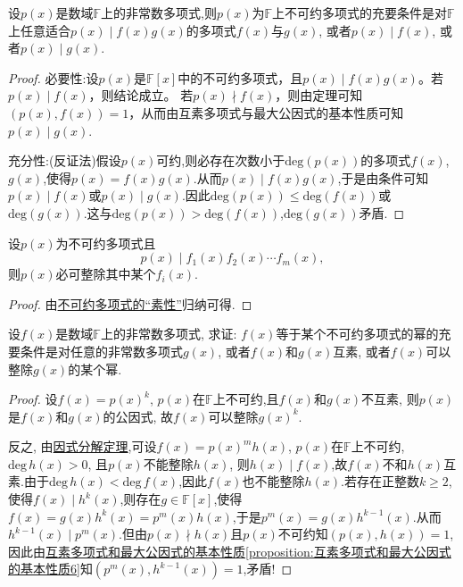 \documentclass[../../main.tex]{subfiles}%
\begin{document}
\begin{theorem}[不可约多项式的“素性”]\label{theorem:不可约多项式的“素性”}
设\(p(x)\)是数域\(\mathbb{F}\)上的非常数多项式,则\(p(x)\)为\(\mathbb{F}\)上不可约多项式的充要条件是对\(\mathbb{F}\)上任意适合\(p(x)\mid f(x)g(x)\)的多项式\(f(x)\)与\(g(x)\), 或者\(p(x)\mid f(x)\), 或者\(p(x)\mid g(x)\).
\end{theorem}
\begin{proof}
必要性:设\(p(x)\)是\(\mathbb{F}[x]\)中的不可约多项式，且\(p(x)\mid f(x)g(x)\)。若\(p(x)\mid f(x)\)，则结论成立。
若\(p(x)\nmid f(x)\)，则由定理可知\((p(x),f(x)) = 1\)，从而由互素多项式与最大公因式的基本性质可知\(p(x)\mid g(x)\).

充分性:(反证法)假设\(p(x)\)可约,则必存在次数小于\(\text{deg}(p(x))\)的多项式\(f(x)\),\(g(x)\),使得\(p(x) = f(x)g(x)\).从而\(p(x) \mid f(x)g(x)\),于是由条件可知\(p(x) \mid f(x)\)或\(p(x) \mid g(x)\).因此\(\text{deg}(p(x)) \leqslant  \text{deg}(f(x))\)或\(\text{deg}(g(x))\).这与\(\text{deg}(p(x)) > \text{deg}(f(x))\),\(\text{deg}(g(x))\)矛盾.
\end{proof}

\begin{corollary}\label{corollary:不可约多项式“素性”的推论}
设\(p(x)\)为不可约多项式且
\[
p(x)\mid f_1(x)f_2(x)\cdots f_m(x),
\]
则\(p(x)\)必可整除其中某个\(f_i(x)\).
\end{corollary}
\begin{proof}
由\hyperref[theorem:不可约多项式的“素性”]{不可约多项式的“素性”}归纳可得.
\end{proof}

\begin{proposition}\label{proposition:多项式可以写成不可约多项式的幂的充要条件}
设\(f(x)\)是数域\(\mathbb{F}\)上的非常数多项式, 求证: \(f(x)\)等于某个不可约多项式的幂的充要条件是对任意的非常数多项式\(g(x)\), 或者\(f(x)\)和\(g(x)\)互素, 或者\(f(x)\)可以整除\(g(x)\)的某个幂.
\end{proposition}
\begin{proof}
设\(f(x)=p(x)^k\), \(p(x)\)在\(\mathbb{F}\)上不可约,且\(f(x)\)和\(g(x)\)不互素, 则\(p(x)\)是\(f(x)\)和\(g(x)\)的公因式, 故\(f(x)\)可以整除\(g(x)^k\).

反之, 由\hyperref[theorem:因式分解定理]{因式分解定理},可设\(f(x)=p(x)^mh(x)\), \(p(x)\)在\(\mathbb{F}\)上不可约, \(\mathrm{deg }\,h(x)>0\), 且\(p(x)\)不能整除\(h(x)\), 则\(h(x)\mid f(x)\),故$f(x)$不和$h(x)$互素.由于$\mathrm{deg}\,h(x)<\mathrm{deg }\,f(x)$,因此$f(x)$也不能整除\(h(x)\).若存在正整数$k\geqslant 2$,使得$f(x)\mid h^k(x)$,则存在$g\in \mathbb{F}[x]$,使得$f(x)=g(x)h^k(x)=p^m(x)h(x)$,于是$p^m(x)=g(x)h^{k-1}(x)$.从而$h^{k-1}(x)\mid p^m(x)$.但由$p(x)\nmid h(x)$且$p(x)$不可约知$(p(x),h(x))=1$,因此由\hyperref[proposition:互素多项式和最大公因式的基本性质6]{互素多项式和最大公因式的基本性质\ref{proposition:互素多项式和最大公因式的基本性质6}}知$(p^m(x),h^{k-1}(x))=1$,矛盾!
\end{proof}
\end{document}
